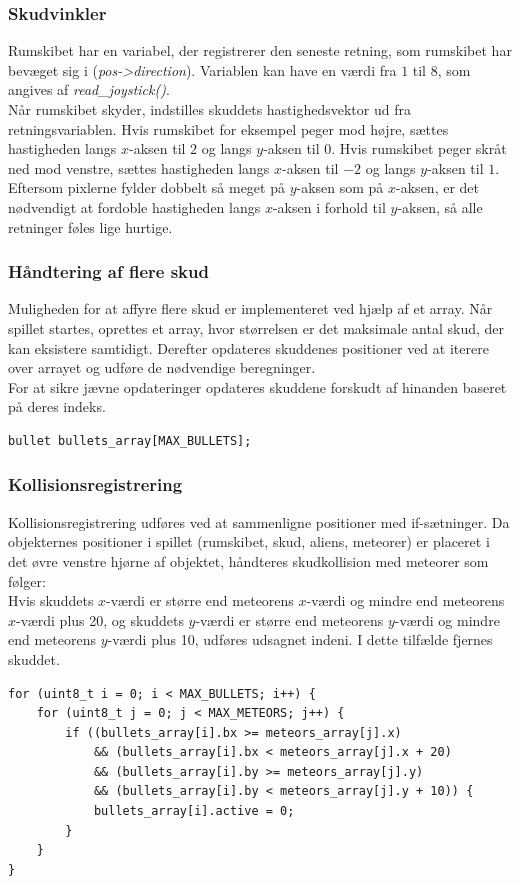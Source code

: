 \subsubsection{Skudvinkler}
Rumskibet har en variabel, der registrerer den seneste retning, som rumskibet har bevæget sig i (\textit{pos->direction}). Variablen kan have en værdi fra \(1\) til \(8\), som angives af \textit{read\_joystick()}.\\
Når rumskibet skyder, indstilles skuddets hastighedsvektor ud fra retningsvariablen. Hvis rumskibet for eksempel peger mod højre, sættes hastigheden langs \(x\)-aksen til \(2\) og langs \(y\)-aksen til \(0\). Hvis rumskibet peger skråt ned mod venstre, sættes hastigheden langs \(x\)-aksen til \(-2\) og langs \(y\)-aksen til \(1\).\\
Eftersom pixlerne fylder dobbelt så meget på \(y\)-aksen som på \(x\)-aksen, er det nødvendigt at fordoble hastigheden langs \(x\)-aksen i forhold til \(y\)-aksen, så alle retninger føles lige hurtige.

\subsubsection{Håndtering af flere skud}
Muligheden for at affyre flere skud er implementeret ved hjælp af et array. Når spillet startes, oprettes et array, hvor størrelsen er det maksimale antal skud, der kan eksistere samtidigt. Derefter opdateres skuddenes positioner ved at iterere over arrayet og udføre de nødvendige beregninger.\\
For at sikre jævne opdateringer opdateres skuddene forskudt af hinanden baseret på deres indeks.
\begin{lstlisting}[caption={Skudarray kode}] 
bullet bullets_array[MAX_BULLETS];
\end{lstlisting}

\subsubsection{Kollisionsregistrering}
Kollisionsregistrering udføres ved at sammenligne positioner med if-sætninger. Da objekternes positioner i spillet (rumskibet, skud, aliens, meteorer) er placeret i det øvre venstre hjørne af objektet, håndteres skudkollision med meteorer som følger:\\
Hvis skuddets \(x\)-værdi er større end meteorens \(x\)-værdi og mindre end meteorens \(x\)-værdi plus 20, og skuddets \(y\)-værdi er større end meteorens \(y\)-værdi og mindre end meteorens \(y\)-værdi plus 10, udføres udsagnet indeni. I dette tilfælde fjernes skuddet.
\begin{lstlisting}[caption={Kollisionsregistrering kode}]
for (uint8_t i = 0; i < MAX_BULLETS; i++) {
    for (uint8_t j = 0; j < MAX_METEORS; j++) {
        if ((bullets_array[i].bx >= meteors_array[j].x)
            && (bullets_array[i].bx < meteors_array[j].x + 20)
            && (bullets_array[i].by >= meteors_array[j].y)
            && (bullets_array[i].by < meteors_array[j].y + 10)) {
            bullets_array[i].active = 0;
        }
    }
}
\end{lstlisting}

